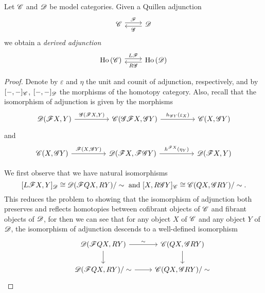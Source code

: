 \documentclass[10pt]{amsart}
\begin{document}
\begin{lem}
  Let $\mathscr{C}$ and $\mathscr{D}$ be model categories.
  Given a Quillen adjunction
  $$\begin{tikzcd}
    \C \arrow[shift left]{r}{\F} & \D \arrow[shift left]{l}{\G}
  \end{tikzcd}$$
  we obtain a {\it derived adjunction}
  $$\begin{tikzcd}
    \Ho{\C} \arrow[shift left]{r}{L\F} & \Ho{\D} \arrow[shift left]{l}{R\G}
  \end{tikzcd}$$

  \begin{proof}
    Denote by $\varepsilon$ and $\eta$ the unit and counit of adjunction, respectively, and by $[-,-]_{\mathscr{C}}$, $[-,-]_{\mathscr{D}}$ the morphisms of the homotopy category.
    Also, recall that the isomorphism of adjunction is given by the morphisms
    $$\begin{tikzcd}
      \D(\F X, Y) \arrow{rr}{\G(\F X, Y)} && \C(\G \F X, \G Y) \arrow{rr}{h_{\G Y}(\varepsilon_X)} && \C(X, \G Y) 
    \end{tikzcd}$$
    and
    $$\begin{tikzcd}
      \C(X, \G Y) \arrow{rr}{\F(X, \G Y)} && \D(\F X, \F \G Y) \arrow{rr}{h^{\F X}(\eta_Y)}&& \D(\F X, Y)
    \end{tikzcd}$$
    
    We first observe that we have natural isomorphisms
    $$[L\F X, Y]_\D \cong \D(\F Q X, R Y)/\sim\ \text{and}\ 
    [X, R\G Y]_\C \cong \C(Q X, \G R Y)/\sim.$$
    This reduces the problem to showing that the isomorphism of adjunction both preserves and reflects homotopies between cofibrant objects of $\mathscr{C}$ and fibrant objects of $\mathscr{D}$, for then we can see that for any object $X$ of $\mathscr{C}$ and any object $Y$ of $\mathscr{D}$, the isomorphism of adjunction descends to a well-defined isomorphism
    $$\begin{tikzcd}
      & \D(\F Q X, R Y) \arrow{r}{\sim}\arrow{d} & \C(Q X, \G R Y)\arrow{d}\\
      & \D(\F Q X, RY)/\sim \arrow{r} & \C(QX, \G R Y)/\sim
    \end{tikzcd}$$
    

\end{proof}
\end{lem}
\end{document}
